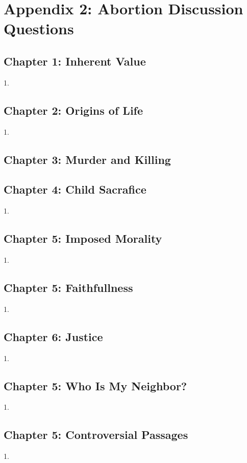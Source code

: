 \chapter{Appendix 2: Abortion Discussion Questions}

\section{Chapter 1: Inherent Value}
1. 

\section{Chapter 2: Origins of Life}
1.

\section{Chapter 3: Murder and Killing}


\section{Chapter 4: Child Sacrafice}
1. 

\section{Chapter 5: Imposed Morality}
1. 

\section{Chapter 5: Faithfullness}
1. 

\section{Chapter 6: Justice}
1. 

\section{Chapter 5: Who Is My Neighbor?}
1. 

\section{Chapter 5: Controversial Passages}
1. 
